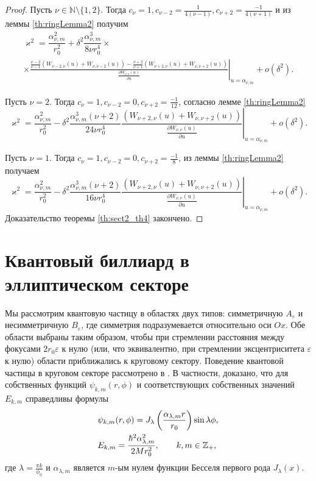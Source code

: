 \begin{proof}
Пусть $\nu \in \mathbb{N} \setminus \{1, 2\}$. Тогда $c_\nu=1,
	c_{\nu-2} = \frac{1}{4(\nu-1)}, c_{\nu+2} = \frac{-1}{4(\nu+1)}$ и из леммы \ref{th:ringLemma2}  получим
\begin{multline*}
\varkappa^2 = \dfrac{\alpha_{\nu, m}^2}{r_0^2} + \delta^2 \dfrac{\alpha_{\nu, m}^3}{8 \nu r_0^4} \times \\
 \times \left. \frac{
\frac{\nu-2}{\nu-1}
\left(
W_{\nu-2, \nu}(u) + W_{\nu, \nu-2}(u)
\right)- 
\frac{\nu+2}{\nu+1}
\left(
W_{\nu+2, \nu}(u) + W_{\nu, \nu+2}(u)
\right)
}{ \frac{\partial W_{\nu,\nu}(u)}{\partial u} }\right|_{u=\alpha_{\nu, m}} + o(\delta^2).
\end{multline*}


Пусть $\nu = 2$. Тогда $c_\nu = 1, c_{\nu-2} = 0, c_{\nu+2} = \frac{-1}{12} $, согласно лемме \ref{th:ringLemma2} 
$$\varkappa^2 = \dfrac{\alpha_{\nu, m}^2}{r_0^2} - \delta^2 \dfrac{\alpha_{\nu, m}^3(\nu+2)}{24 \nu  r_0^4} \left. \frac{
	\left(
	W_{\nu+2, \nu}(u) + W_{\nu, \nu+2}(u)
	\right)
}{ \frac{\partial W_{\nu,\nu}(u)}{\partial u} }\right|_{u=\alpha_{\nu, m}} + o(\delta^2).$$

Пусть $\nu = 1$. Тогда $c_\nu = 1, c_{\nu-2} = 0, c_{\nu+2} = \frac{-1}{8}$, из леммы \ref{th:ringLemma2}  получаем
$$\varkappa^2 = \dfrac{\alpha_{\nu, m}^2}{r_0^2} - \delta^2 \dfrac{\alpha_{\nu, m}^3 (\nu+2)}{16 \nu r_0^4}
\left. \frac{
	\left(
	W_{\nu+2, \nu}(u) + W_{\nu, \nu+2}(u)
	\right)
}{ \frac{\partial W_{\nu,\nu}(u)}{\partial u} }\right|_{u=\alpha_{\nu, m}} + o(\delta^2).$$
Доказательство теоремы \ref{th:sect2_th4} закончено.
\end{proof}

\section{Квантовый биллиард в эллиптическом секторе}\label{sec:ch2/sec2}

Мы рассмотрим квантовую частицу в областях двух типов: симметричную $A_\varepsilon$ и несимметричную $B_\varepsilon$, где симметрия подразумевается относительно оси $Ox$.
Обе области выбраны таким образом, чтобы при стремлении расстояния между фокусами $2r_0 \varepsilon $ к нулю (или, что эквивалентно, при стремлении эксцентриситета $\varepsilon$ к нулю) области приближались к круговому сектору.
Поведение квантовой частицы в круговом секторе рассмотрено в \cite{wref13}.
В частности, доказано, что для собственных функций $\psi_{k,m}(r,\phi)$ и соответствующих собственных значений $E_{k,m}$ справедливы формулы
\begin{align}
&\psi_{k, m}(r, \phi) = J_\lambda\left(\frac{\alpha_{\lambda, m}r}{r_0}\right)\sin{\lambda\phi}, \notag \\  
&E_{k,m} = \frac{\hbar^2 \alpha_{\lambda, m}^2}{2M r_0^2},
 \qquad k, m \in \mathbb{Z}_+, \label{eq:energy0}
\end{align}
где 
$\lambda = \frac{\pi k}{\phi_0}$ и $\alpha_{\lambda, m}$ является
$m$-ым нулем функции Бесселя первого рода $J_\lambda(x)$.

